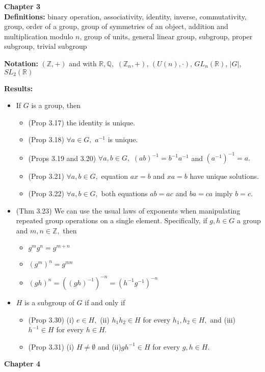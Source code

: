 \documentclass[12pt]{article}
\newcommand{\bbZ}{\mathbb{Z}}
\newcommand{\bbR}{\mathbb{R}}
\newcommand{\bbQ}{\mathbb{Q}}
\begin{document}
\noindent \textbf{Chapter 3}\\

\textbf{Definitions:} binary operation, associativity, identity, inverse, commutativity, group, order of a group, group of symmetries of an object, addition and multiplication modulo $n$, group of units, general linear group, subgroup, proper subgroup, trivial subgroup

\textbf{Notation:} $(\bbZ,+)$ and with $\bbR,\bbQ,$  $(\bbZ_n,+)$, $(U(n), \cdot )$, $GL_n(\bbR)$, $|G|$, $SL_2(\bbR)$

\textbf{Results:}
\begin{itemize}
	\item If $G$ is a group, then
		\begin{itemize}
		\item (Prop 3.17) the identity is unique.
		\item (Prop 3.18) $\forall a \in G,$ $a^{-1}$ is unique.
		\item (Props 3.19 and 3.20) $\forall a,b \in G,$ $(ab)^{-1}=b^{-1}a^{-1}$ and $(a^{-1})^{-1}=a.$
		\item (Prop 3.21) $\forall a,b \in G,$ equation $ax=b$ and $xa=b$ have unique solutions.
		\item (Prop 3.22) $\forall a,b \in G,$ both equations $ab=ac$ and $ba=ca$ imply $b=c.$
		\end{itemize}
	\item (Thm 3.23) We can use the usual laws of exponents when manipulating repeated group operations on a single element. Specifically, if $g,h \in G$ a group and $m,n \in \bbZ,$ then
		\begin{itemize}
		\item $g^mg^n=g^{m+n}$
		\item $(g^m)^n=g^{mn}$
		\item $(gh)^n=((gh)^{-1})^{-n}=(h^{-1}g^{-1})^{-n}$
		\end{itemize}
	\item $H$ is a subgroup of $G$ if and only if
		\begin{itemize}
		\item (Prop 3.30) (i) $e \in H,$ (ii) $h_1h_2 \in H$ for every $h_1,h_2 \in H,$ and (iii) $h^{-1} \in H$ for every $h \in H.$
		\item (Prop 3.31) (i) $H \not= \emptyset$ and (ii)$gh^{-1} \in H$ for every $g,h \in H.$
		\end{itemize}
\end{itemize}

\noindent \textbf{Chapter 4}\\
\end{document}
